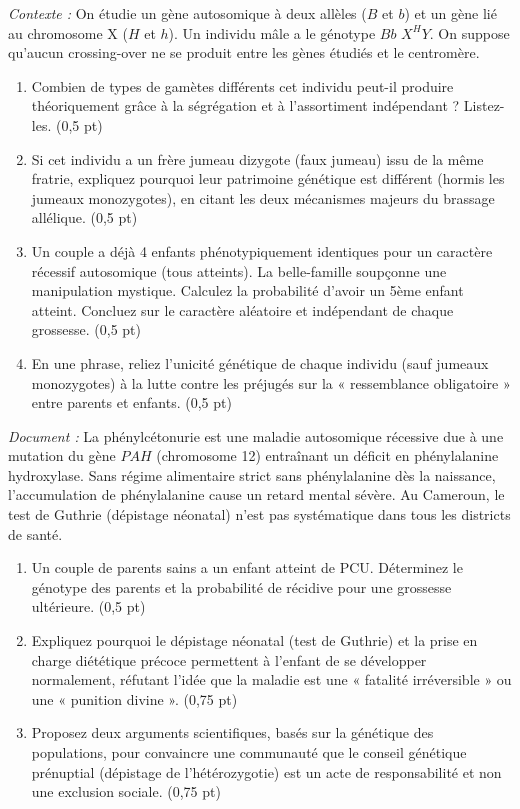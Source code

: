 \documentclass[11pt]{article}
\begin{document}
\begin{exercice}
\emph{Contexte :} On étudie un gène autosomique à deux allèles ($B$ et $b$) et un gène lié au chromosome X ($H$ et $h$). Un individu mâle a le génotype $Bb$ $X^{H}Y$. On suppose qu'aucun crossing-over ne se produit entre les gènes étudiés et le centromère.
\begin{enumerate}
\item Combien de types de gamètes différents cet individu peut-il produire théoriquement grâce à la ségrégation et à l'assortiment indépendant ? Listez-les. \hfill (0,5 pt)
\item Si cet individu a un frère jumeau dizygote (faux jumeau) issu de la même fratrie, expliquez pourquoi leur patrimoine génétique est différent (hormis les jumeaux monozygotes), en citant les deux mécanismes majeurs du brassage allélique. \hfill (0,5 pt)
\item Un couple a déjà 4 enfants phénotypiquement identiques pour un caractère récessif autosomique (tous atteints). La belle-famille soupçonne une manipulation mystique. Calculez la probabilité d'avoir un 5ème enfant atteint. Concluez sur le caractère aléatoire et indépendant de chaque grossesse. \hfill (0,5 pt)
\item En une phrase, reliez l'unicité génétique de chaque individu (sauf jumeaux monozygotes) à la lutte contre les préjugés sur la « ressemblance obligatoire » entre parents et enfants. \hfill (0,5 pt)
\end{enumerate}
\end{exercice}

\begin{exercice}
\emph{Document :} La phénylcétonurie est une maladie autosomique récessive due à une mutation du gène $PAH$ (chromosome 12) entraînant un déficit en phénylalanine hydroxylase. Sans régime alimentaire strict sans phénylalanine dès la naissance, l'accumulation de phénylalanine cause un retard mental sévère. Au Cameroun, le test de Guthrie (dépistage néonatal) n'est pas systématique dans tous les districts de santé.
\begin{enumerate}
\item Un couple de parents sains a un enfant atteint de PCU. Déterminez le génotype des parents et la probabilité de récidive pour une grossesse ultérieure. \hfill (0,5 pt)
\item Expliquez pourquoi le dépistage néonatal (test de Guthrie) et la prise en charge diététique précoce permettent à l'enfant de se développer normalement, réfutant l'idée que la maladie est une « fatalité irréversible » ou une « punition divine ». \hfill (0,75 pt)
\item Proposez deux arguments scientifiques, basés sur la génétique des populations, pour convaincre une communauté que le conseil génétique prénuptial (dépistage de l'hétérozygotie) est un acte de responsabilité et non une exclusion sociale. \hfill (0,75 pt)
\end{enumerate}
\end{exercice}
\end{document}
